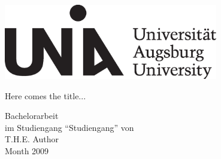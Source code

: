 \begin{titlepage}
\begin{center}

\includegraphics[width=0.7\textwidth]{titlepagelogo}

\vspace{2.7cm}
\LARGE
\textsf{Here comes the title...}

\vspace{1.5cm}
\Large
\textsf{Bachelorarbeit} \\[0.2\baselineskip]

\textsf{im Studiengang "`Studiengang"' von} \\[0.6\baselineskip]
\LARGE
\textsf{T.H.E. Author} \\[0.6\baselineskip]
\Large
\textsf{Month 2009}

\end{center}

\end{titlepage}

